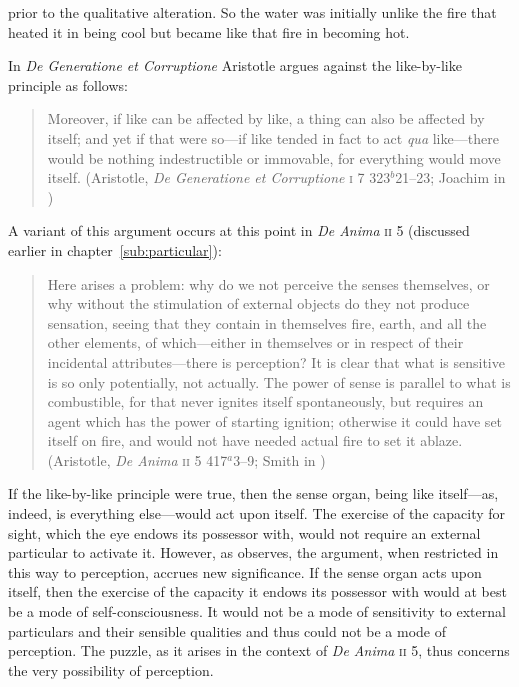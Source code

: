 prior to the qualitative alteration. So the water was initially unlike the fire that heated it in being cool but became like that fire in becoming hot. 

In \emph{De Generatione et Corruptione} Aristotle argues against the like-by-like principle as follows:
\begin{quote}
	Moreover, if like can be affected by like, a thing can also be affected by itself; and yet if that were so---if like tended in fact to act \emph{qua} like---there would be nothing indestructible or immovable, for everything would move itself. (Aristotle, \emph{De Generatione et Corruptione} \textsc{i} 7 323\( ^{b} \)21--23; Joachim in \citealt[23]{Barnes:1984uq})
\end{quote}
A variant of this argument occurs at this point in \emph{De Anima} \textsc{ii} 5 (discussed earlier in chapter~\ref{sub:particular}):
\begin{quote}
	Here arises a problem: why do we not perceive the senses themselves, or why without the stimulation of external objects do they not produce sensation, seeing that they contain in themselves fire, earth, and all the other elements, of which---either in themselves or in respect of their incidental attributes---there is perception? It is clear that what is sensitive is so only potentially, not actually. The power of sense is parallel to what is combustible, for that never ignites itself spontaneously, but requires an agent which has the power of starting ignition; otherwise it could have set itself on fire, and would not have needed actual fire to set it ablaze. (Aristotle, \emph{De Anima} \textsc{ii} 5 417\( ^{a} \)3--9; Smith in \citealt[29]{Barnes:1984uq})
\end{quote}
If the like-by-like principle were true, then the sense organ, being like itself---as, indeed, is everything else---would act upon itself. The exercise of the capacity for sight, which the eye endows its possessor with, would not require an external particular to activate it. However, as \citet[226--227]{Polansky:2007ly} observes, the argument, when restricted in this way to perception, accrues new significance. If the sense organ acts upon itself, then the exercise of the capacity it endows its possessor with would at best be a mode of self-consciousness. It would not be a mode of sensitivity to external particulars and their sensible qualities and thus could not be a mode of perception. The puzzle, as it arises in the context of \emph{De Anima} \textsc{ii} 5, thus concerns the very possibility of perception.

